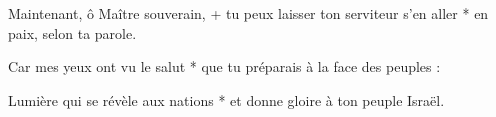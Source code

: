 \item Maintenant, ô Maître souverain, +
tu peux laisser ton serviteur s'en aller *
en paix, selon ta parole.

\item Car mes yeux ont vu le salut *
que tu préparais à la face des peuples :

\item Lumière qui se révèle aux nations *
et donne gloire à ton peuple Israël.